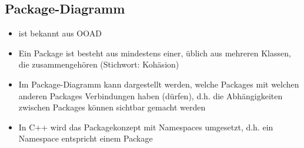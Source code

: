 \subsection{Package-Diagramm}
\begin{itemize}
	\item ist bekannt aus OOAD
	\item Ein Package ist besteht aus mindestens einer, üblich aus mehreren Klassen, die zusammengehören (Stichwort: Kohäsion)
	\item Im Package-Diagramm kann dargestellt werden, welche Packages mit welchen anderen Packages Verbindungen haben (dürfen), d.h. die Abhängigkeiten zwischen Packages können sichtbar gemacht werden
	\item In C++ wird das Packagekonzept mit Namespaces umgesetzt, d.h. ein Namespace entspricht einem Package
\end{itemize}
